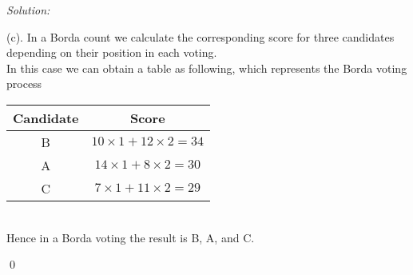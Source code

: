 \documentclass[12pt]{article}
\newenvironment{sol}
    {\emph{Solution:}
    }
    {
    \qed
    }
\begin{document}
\begin{sol}
	(c). In a Borda count we calculate the corresponding score for three candidates depending on their position in each voting. \\
	In this case we can obtain a table as following, which represents the Borda voting process
	\begin{table}[h]
		\centering
		\begin{tabular}{|c|c|}
			\hline
			Candidate & Score \\ \hline
			B & $10\times 1 + 12\times 2 = 34$\\ \hline
			A & $14\times1+8\times2 = 30$ \\ \hline
			C & $7\times1+11\times2 = 29$ \\ \hline 
		\end{tabular}
	\end{table}\\
	Hence in a Borda voting the result is B, A, and C.
\end{sol}
\end{document}
